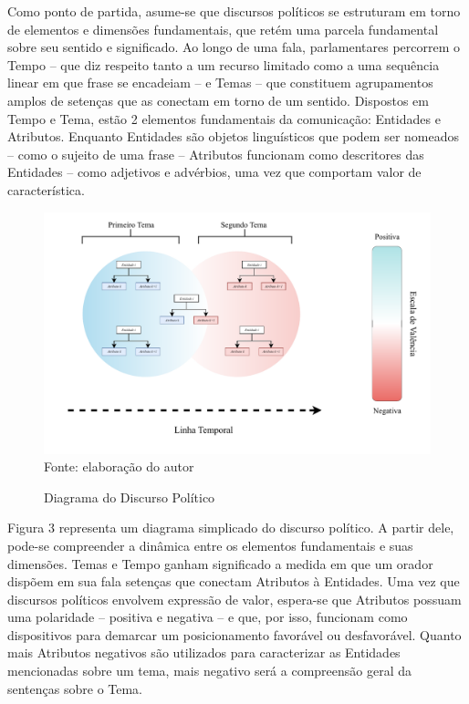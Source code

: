 \documentclass[
12pt,				%
openright,			%
twoside,			%
a4paper,			%
english,			%
french,				%
spanish,			%
brazil				%
]{abntex2}
\begin{document}
Como ponto de partida, asume-se que discursos políticos se estruturam em torno de elementos e dimensões fundamentais, que retém uma parcela fundamental sobre seu sentido e significado. Ao longo de uma fala, parlamentares percorrem o Tempo -- que diz respeito tanto a um recurso limitado como a uma sequência linear em que frase se encadeiam -- e Temas -- que constituem agrupamentos amplos de setenças que as conectam em torno de um sentido. Dispostos em Tempo e Tema, estão 2 elementos fundamentais da comunicação: Entidades e Atributos. Enquanto Entidades são objetos linguísticos que podem ser nomeados -- como o sujeito de uma frase -- Atributos funcionam como descritores das Entidades -- como adjetivos e advérbios, uma vez que comportam valor de característica.

\begin{figure}[h]
	\caption{Diagrama do Discurso Político}
	\label{fig:discourse_representation}
	\centering
	\includegraphics[width=1\linewidth]{figures/diagrama_discurso_autoritario}
	Fonte: elaboração do autor
\end{figure}

Figura 3 representa um diagrama simplicado do discurso político. A partir dele, pode-se compreender a dinâmica entre os elementos fundamentais e suas dimensões. Temas e Tempo ganham significado a medida em que um orador dispõem em sua fala setenças que conectam Atributos à Entidades. Uma vez que discursos políticos envolvem expressão de valor, espera-se que Atributos possuam uma polaridade -- positiva e negativa -- e que, por isso, funcionam como dispositivos para demarcar um posicionamento favorável ou desfavorável. Quanto mais Atributos negativos são utilizados para caracterizar as Entidades mencionadas sobre um tema, mais negativo será a compreensão geral da sentenças sobre o Tema.
\end{document}
